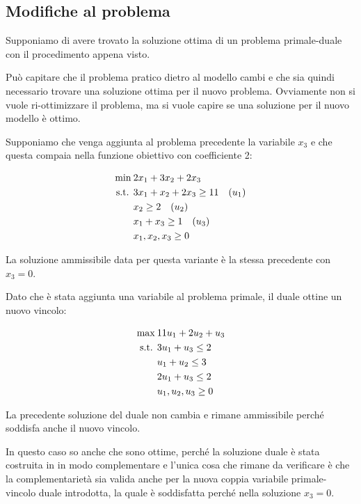 

\subsection{Modifiche al problema}

Supponiamo di avere trovato la soluzione ottima di un problema primale-duale con il procedimento appena visto.

Può capitare che il problema pratico dietro al modello cambi e che sia quindi necessario trovare una soluzione ottima per il nuovo problema.
Ovviamente non si vuole ri-ottimizzare il problema, ma si vuole capire se una soluzione per il nuovo modello è ottimo.

Supponiamo che venga aggiunta al problema precedente la variabile $x_3$ e che questa compaia nella funzione obiettivo con coefficiente 2:

\begin{align*}
\min\:& 2x_1 + 3x_2 +2x_3\\
\text{s.t. }  & 3x_1 + x_2 +2x_3\geq 11 \quad (u_1)\\
& x_2 \geq 2 \quad (u_2) \\
& x_1 +x_3\geq 1 \quad (u_3) \\
& x_1, x_2, x_3 \geq 0
\end{align*}

La soluzione ammissibile data per questa variante è la stessa precedente con $x_3 = 0$.

Dato che è stata aggiunta una variabile al problema primale, il duale ottine un nuovo vincolo:

\begin{align*}
\max\:& 11u_1 + 2u_2 + u_3 \\
\text{s.t. }  & 3u_1 + u_3 \leq 2 \\
& u_1 + u_2 \leq 3\\
& 2u_1 + u_3 \leq 2\\
& u_1, u_2, u_3 \geq 0
\end{align*}

La precedente soluzione del duale non cambia e rimane ammissibile perché soddisfa anche il nuovo vincolo.

In questo caso so anche che sono ottime, perché la soluzione duale è stata costruita in in modo complementare e l'unica cosa che rimane da verificare è che la complementarietà sia valida anche per la nuova coppia variabile primale-vincolo duale introdotta, la quale è soddisfatta perché nella soluzione $x_3 = 0$.

